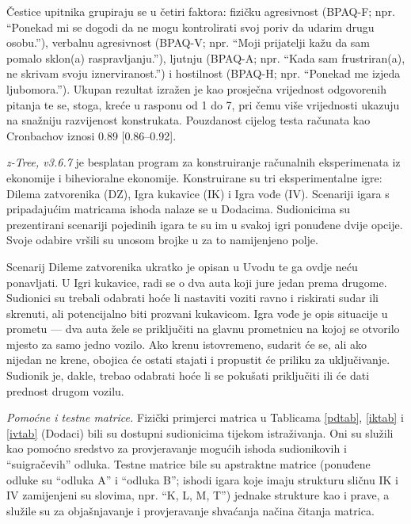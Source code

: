 \documentclass[a4paper, 12pt]{report}
\begin{document}
Čestice
upitnika grupiraju se u četiri faktora: fizičku agresivnost
(BPAQ-F; npr. \enquote{Ponekad mi se dogodi da ne mogu kontrolirati svoj poriv da udarim
    drugu osobu.}), verbalnu agresivnost (BPAQ-V; npr.
\enquote{Moji prijatelji kažu da sam
    pomalo sklon(a) raspravljanju.}), ljutnju
(BPAQ-A; npr. \enquote{Kada sam frustriran(a),
    ne skrivam svoju iznerviranost.}) i
hostilnost (BPAQ-H; npr. \enquote{Ponekad me izjeda
    ljubomora.}). Ukupan rezultat izražen je kao
prosječna vrijednost odgovorenih pitanja te se, stoga, kreće u rasponu od 1
do 7, pri čemu više vrijednosti ukazuju na snažniju razvijenost konstrukata.
Pouzdanost cijelog testa
računata kao Cronbachov {\textalpha} iznosi 0.89 [0.86--0.92].

\emph{z-Tree, v3.6.7} \citep{fischbacher2007z} je besplatan program za
konstruiranje računalnih eksperimenata iz ekonomije i bihevioralne ekonomije.
Konstruirane su tri eksperimentalne igre: Dilema zatvorenika (DZ), Igra kukavice
(IK) i Igra vođe (IV). Scenariji igara s pripadajućim matricama ishoda nalaze se
u Dodacima. Sudionicima su prezentirani scenariji pojedinih igara te su im
u svakoj igri ponuđene dvije  opcije. Svoje odabire vršili su unosom
brojke u za to namijenjeno polje.

Scenarij Dileme zatvorenika ukratko je opisan u Uvodu te ga ovdje neću
ponavljati. U Igri kukavice, radi se o dva auta koji jure jedan prema drugome.
Sudionici su trebali odabrati hoće li nastaviti voziti ravno i riskirati sudar ili
skrenuti, ali potencijalno biti prozvani kukavicom. Igra vođe je opis situacije
u prometu --- dva auta žele se priključiti na glavnu prometnicu na kojoj se
otvorilo mjesto za samo jedno vozilo. Ako krenu
istovremeno, sudarit će se, ali ako nijedan ne  krene, obojica će ostati stajati
i propustit će priliku za uključivanje. Sudionik je, dakle, trebao odabrati hoće
li se pokušati priključiti ili će dati prednost drugom vozilu.

\emph{Pomoćne i testne matrice.} Fizički primjerci matrica u Tablicama
\ref{pdtab}, \ref{iktab} i \ref{ivtab} (Dodaci) bili su dostupni sudionicima tijekom
istraživanja. Oni su služili kao pomoćno sredstvo za provjeravanje 
mogućih ishoda sudionikovih i \enquote{suigračevih} odluka. Testne matrice bile
su apstraktne matrice (ponuđene odluke su \enquote{odluka A} i \enquote{odluka
    B}; ishodi igara koje imaju strukturu sličnu IK i IV  zamijenjeni su
 slovima, npr. \enquote{K, L, M, T}) jednake strukture kao i prave, a služile su za
objašnjavanje i provjeravanje shvaćanja načina čitanja matrica.
\end{document}
